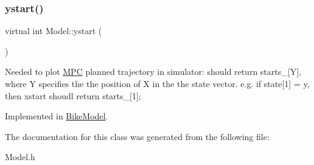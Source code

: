\subsubsection{\texorpdfstring{ystart()}{ystart()}}
{\footnotesize\ttfamily virtual int Model\+::ystart (\begin{DoxyParamCaption}{ }\end{DoxyParamCaption})\hspace{0.3cm}{\ttfamily [pure virtual]}}

Needed to plot \mbox{\hyperlink{classMPC}{M\+PC}} planned trajectory in simulator\+: should return starts\+\_\+\mbox{[}Y\mbox{]}, where Y specifies the the position of X in the the state vector. e.\+g. if state\mbox{[}1\mbox{]} = y, then xstart shoudl return starts\+\_\+\mbox{[}1\mbox{]}; 

Implemented in \mbox{\hyperlink{classBikeModel_a05b988f106df902d1222dfb662d4b1fa}{Bike\+Model}}.



The documentation for this class was generated from the following file\+:\begin{DoxyCompactItemize}
\item 
Model.\+h\end{DoxyCompactItemize}

